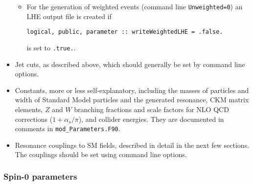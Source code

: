 \documentclass[aps,superscriptaddress,nofootinbib]{revtex4}
\begin{document}
\begin{itemize}
\begin{itemize}
\item
For the generation of weighted events (command line \verb|Unweighted=0|) an LHE output file is created if
\begin{verbatim}
logical, public, parameter :: writeWeightedLHE = .false.
\end{verbatim}
is set to \verb|.true.|.
\end{itemize}

\item
Jet cuts, as described above, which should generally be set by command line options.

\item Constants, more or less self-explanatory, including the masses of particles and width of Standard Model particles and the generated resonance, CKM matrix elements, $Z$ and $W$ branching fractions and scale factors for NLO QCD corrections ($1+\alpha_s/\pi$), and collider energies.  They are documented in comments in \verb|mod_Parameters.F90|.

\item Resonance couplings to SM fields, described in detail in the next few sections.  The couplings should be set using command line options.
\end{itemize}

\subsubsection{ Spin-0 parameters }
\label{spin0}
\end{document}
